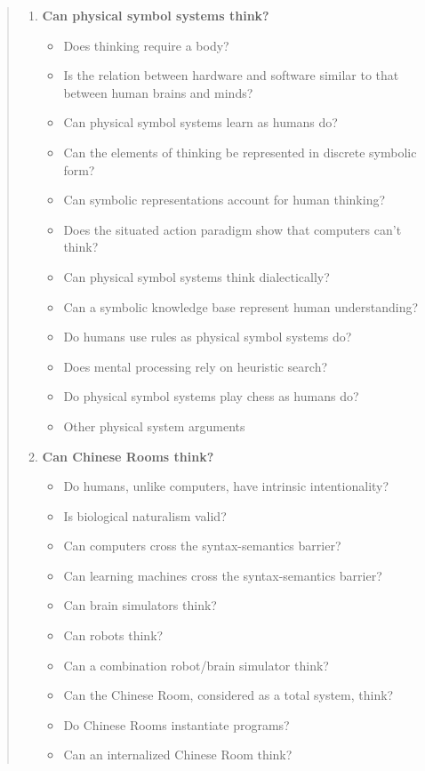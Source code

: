 \begin{quotation}
\begin{enumerate}
    \item \textbf{Can physical symbol systems think?}
      \begin{itemize}
        \item Does thinking require a body?
        \item Is the relation between hardware and software similar to that between human brains and minds?
        \item Can physical symbol systems learn as humans do?
        \item Can the elements of thinking be represented in discrete symbolic form?
        \item Can symbolic representations account for human thinking?
        \item Does the situated action paradigm show that computers can't think?
        \item Can physical symbol systems think dialectically?
        \item Can a symbolic knowledge base represent human understanding?
        \item Do humans use rules as physical symbol systems do?
        \item Does mental processing rely on heuristic search?
        \item Do physical symbol systems play chess as humans do?
        \item Other physical system arguments
      \end{itemize}
    \item \textbf{Can Chinese Rooms think?}
      \begin{itemize}
        \item Do humans, unlike computers, have intrinsic intentionality?
        \item Is biological naturalism valid?
        \item Can computers cross the syntax-semantics barrier?
        \item Can learning machines cross the syntax-semantics barrier?
        \item Can brain simulators think?
        \item Can robots think?
        \item Can a combination robot/brain simulator think?
        \item Can the Chinese Room, considered as a total system, think?
        \item Do Chinese Rooms instantiate programs?
        \item Can an internalized Chinese Room think?

\end{itemize}
\end{enumerate}
\end{quotation}
